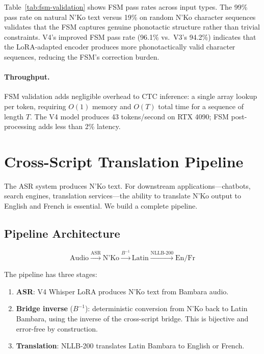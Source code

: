 \documentclass[11pt]{article}
\begin{document}
Table~\ref{tab:fsm-validation} shows FSM pass rates across input types.
The 99\% pass rate on natural N'Ko text versus 19\% on random N'Ko character sequences validates that the FSM captures genuine phonotactic structure rather than trivial constraints.
V4's improved FSM pass rate (96.1\% vs.\ V3's 94.2\%) indicates that the LoRA-adapted encoder produces more phonotactically valid character sequences, reducing the FSM's correction burden.

\paragraph{Throughput.}
FSM validation adds negligible overhead to CTC inference: a single array lookup per token, requiring $O(1)$ memory and $O(T)$ total time for a sequence of length $T$.
The V4 model produces 43 tokens/second on RTX 4090; FSM post-processing adds less than 2\% latency.

\section{Cross-Script Translation Pipeline}
\label{sec:translation}

The ASR system produces N'Ko text.
For downstream applications---chatbots, search engines, translation services---the ability to translate N'Ko output to English and French is essential.
We build a complete pipeline.

\subsection{Pipeline Architecture}

\begin{equation}
\text{Audio} \xrightarrow{\text{ASR}} \text{N'Ko} \xrightarrow{B^{-1}} \text{Latin} \xrightarrow{\text{NLLB-200}} \text{En/Fr}
\end{equation}

The pipeline has three stages:
\begin{enumerate}
\item \textbf{ASR}: V4 Whisper LoRA produces N'Ko text from Bambara audio.
\item \textbf{Bridge inverse} ($B^{-1}$): deterministic conversion from N'Ko back to Latin Bambara, using the inverse of the cross-script bridge. This is bijective and error-free by construction.
\item \textbf{Translation}: NLLB-200 translates Latin Bambara to English or French.
\end{enumerate}
\end{document}
